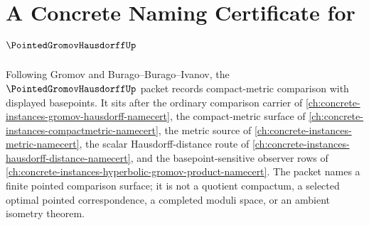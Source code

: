 \chapter{A Concrete Naming Certificate for $\PointedGromovHausdorffUp$}
\label{ch:concrete-instances-pointed-gromov-hausdorff-namecert}

Following Gromov and Burago--Burago--Ivanov, the $\PointedGromovHausdorffUp$ packet records compact-metric comparison with displayed basepoints. It sits after the ordinary comparison carrier of \autoref{ch:concrete-instances-gromov-hausdorff-namecert}, the compact-metric surface of \autoref{ch:concrete-instances-compactmetric-namecert}, the metric source of \autoref{ch:concrete-instances-metric-namecert}, the scalar Hausdorff-distance route of \autoref{ch:concrete-instances-hausdorff-distance-namecert}, and the basepoint-sensitive observer rows of \autoref{ch:concrete-instances-hyperbolic-gromov-product-namecert}. The packet names a finite pointed comparison surface; it is not a quotient compactum, a selected optimal pointed correspondence, a completed moduli space, or an ambient isometry theorem.

